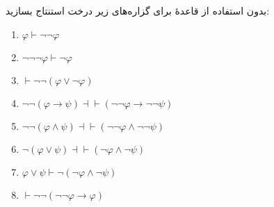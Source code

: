 بدون استفاده از قاعدهٔ  برای گزاره‌های زیر درخت استنتاج بسازید:
\begin{enumerate}[label=(\alph*)]
    \item $\varphi\vdash\neg\neg\varphi$
    \item $\neg\neg\neg\varphi\vdash\neg\varphi$
    \item $\vdash\neg\neg(\varphi\vee\neg\varphi)$
    \item $\neg\neg(\varphi\to\psi)\dashv\vdash(\neg\neg\varphi\to\neg\neg\psi)$
    \item $\neg\neg(\varphi\wedge\psi)\dashv\vdash(\neg\neg\varphi\wedge\neg\neg\psi)$
    \item $\neg(\varphi\vee\psi)\dashv\vdash(\neg\varphi\wedge\neg\psi)$
    \item $\varphi\vee\psi\vdash\neg(\neg\varphi\wedge\neg\psi)$
    \item $\vdash\neg\neg(\neg\neg\varphi\to\varphi)$
\end{enumerate}\quad\vspace{-1cm}
